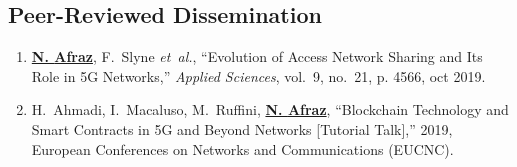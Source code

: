 \subsection{Peer-Reviewed Dissemination}


 \begin{enumerate}
    
    \item \textbf{\underline{N. {Afraz}}}, F.~Slyne \emph{et~al.}, ``Evolution of Access Network Sharing and Its Role in 5G Networks,'' \emph{Applied Sciences}, vol.~9, no.~21, p. 4566, oct 2019.

    \item H.~Ahmadi, I.~Macaluso, M.~{Ruffini}, \textbf{\underline{N. {Afraz}}}, ``Blockchain Technology and Smart Contracts in 5G and Beyond Networks [Tutorial Talk],'' 2019, European Conferences on Networks and Communications (EUCNC).

    \end{enumerate}







